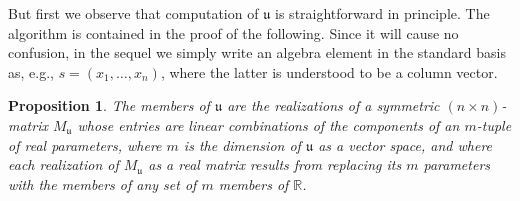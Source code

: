 \documentclass{amsart}
\numberwithin{equation}{section}
\newtheorem{proposition}[theorem]{Proposition}
\theoremstyle{definition}
\numberwithin{theorem}{section}
\begin{document}
But first we observe that computation of $\mathfrak{u}$ is straightforward in principle.  The algorithm is contained in the proof of the following.  Since it will cause no confusion, in the sequel we simply write an algebra element in the standard basis as, e.g., $s=(x_1,\dots,x_n)$, where the latter is understood to be a column vector.

\begin{proposition}\label{9/2/24.1} The members of $\mathfrak{u}$ are the realizations of a symmetric $(n\times n)$-matrix $M_{\mathfrak{u}}$ whose entries are linear combinations of the components of an $m$-tuple of real parameters, where $m$ is the dimension of $\mathfrak{u}$ as a vector space, and where each realization of $M_{\mathfrak{u}}$ as a real matrix results from replacing its $m$ parameters with the members of any set of $m$ members of $\mathbb{R}$.   
\end{proposition}
\end{document}

